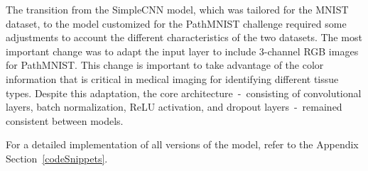 The transition from the SimpleCNN model, which was tailored for the MNIST dataset, to the model customized for the PathMNIST challenge required some adjustments to account the different characteristics of the two datasets. The most important change was to adapt the input layer to include 3-channel RGB images for PathMNIST\@. This change is important to take advantage of the color information that is critical in medical imaging for identifying different tissue types. Despite this adaptation, the core architecture~-~consisting of convolutional layers, batch normalization, ReLU activation, and dropout layers~-~remained consistent between models.

For a detailed implementation of all versions of the model, refer to the Appendix Section~\ref{codeSnippets}.\@